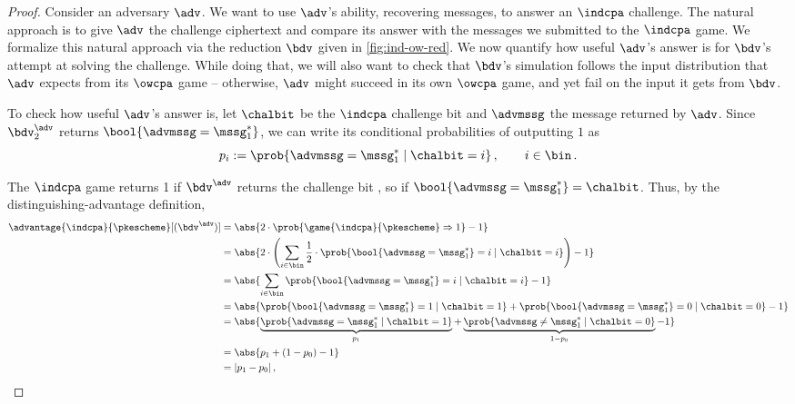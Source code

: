     \begin{proof}
    	Consider an \owcpa adversary $\adv$.
    	We want to use $\adv$'s ability, recovering messages, to answer an $\indcpa$ challenge.
    	The natural approach is to give $\adv$ the challenge ciphertext
    	and compare its answer with the messages we submitted to the $\indcpa$ game.
    	We formalize this natural approach via the reduction $\bdv$ given in \cref{fig:ind-ow-red}.
    	We now quantify how useful $\adv$'s answer is for $\bdv$'s attempt
    	at solving the \indcpa challenge.
    	While doing that, we will also want to check that $\bdv$'s simulation follows the input distribution
    	that $\adv$ expects from its $\owcpa$ game --
    	otherwise, $\adv$ might succeed in its own $\owcpa$ game,
    	and yet fail on the input it gets from $\bdv$.
    	
    	To check how useful $\adv$'s answer is, let $\chalbit$ be the $\indcpa$ challenge bit
    	and $\advmssg$ the message returned by $\adv$.
    	Since $\bdv_2^\adv$ returns $\bool{\advmssg=\mssg_1^*}$,
    	we can write its conditional probabilities of outputting $1$ as
    	\[
	    	p_i := \prob{ \advmssg = \mssg_1^* \mid \chalbit = i } \, ,
	    	\qquad i \in \bin \, .
    	\]
    	
    	The $\indcpa$ game returns 1 if $\bdv^\adv$ returns the challenge bit \chalbit,
    	so if $ \bool{\advmssg=\mssg_1^*} = \chalbit$.
    	Thus, by the distinguishing-advantage definition,
    	\begin{align*}
	    	\advantage{\indcpa}{\pkescheme}[(\bdv^\adv)]
	    	&=	\abs{
	    			2 \cdot \prob{\game{\indcpa}{\pkescheme} \Rightarrow 1} - 1
	    		}
	    	\\
	    	&=	\abs{
		    		2 \cdot	\left(
		    			\sum_{i \in \bin} \frac{1}{2} \cdot \prob{ \bool{\advmssg=\mssg_1^*} = i \mid \chalbit = i }
		    		\right)
		    		- 1
	    		}
	    	\\
	    	&=	\abs{
		    		\sum_{i \in \bin} \prob{ \bool{\advmssg=\mssg_1^*} = i \mid \chalbit = i }
		    		- 1
	    		}
	    	\\
	    	&=	\abs{
		    		\prob{ \bool{\advmssg=\mssg_1^*} = 1 \mid \chalbit = 1 }
		    		+
		    		\prob{ \bool{\advmssg=\mssg_1^*} = 0 \mid \chalbit = 0 }
		    		- 1
	    		}
	    	\\
	    	&=	\abs{
		    		\underbrace{\prob{ \advmssg=\mssg_1^* \mid \chalbit = 1 }}_{p_1}
		    		+
		    		\underbrace{\prob{ \advmssg \neq \mssg_1^* \mid \chalbit = 0 }}_{1-p_0}		    		
		    		- 1
		    	}
	    	\\
	    	&=	\abs{
		    		p_1
		    		+
		    		(1-p_0)
		    		- 1
		    	}
	    	\\
	    	&=	|p_1-p_0| \, ,
    	\end{align*}
    	

\end{proof}
